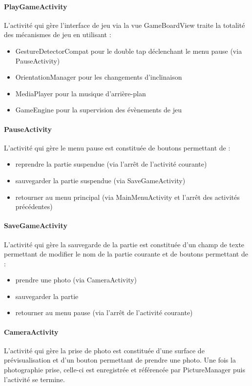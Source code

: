 \documentclass{article}
\begin{document}
\paragraph{PlayGameActivity}
L’activité qui gère l’interface de jeu via la vue GameBoardView traite la totalité des mécanismes de jeu en utilisant :
\begin{itemize}
\item GestureDetectorCompat pour le double tap déclenchant le menu pause (via PauseActivity)
\item OrientationManager pour les changements d’inclinaison
\item MediaPlayer pour la musique d’arrière-plan
\item GameEngine pour la supervision des évènements de jeu
\end{itemize}

\paragraph{PauseActivity}
L’activité qui gère le menu pause est constituée de boutons permettant de :
\begin{itemize}
\item reprendre la partie suspendue (via l’arrêt de l’activité courante)
\item sauvegarder la partie suspendue (via SaveGameActivity)
\item retourner au menu principal (via MainMenuActivity et l’arrêt des activités précédentes)
\end{itemize}

\paragraph{SaveGameActivity}
L’activité qui gère la sauvegarde de la partie est constituée d’un champ de texte permettant de modifier le nom de la partie courante et de boutons permettant de :
\begin{itemize}
\item prendre une photo (via CameraActivity)
\item sauvegarder la partie
\item retourner au menu pause (via l’arrêt de l’activité courante)
\end{itemize}

\paragraph{CameraActivity}
L’activité qui gère la prise de photo est constituée d’une surface de prévisualisation et d’un bouton permettant de prendre une photo. Une fois la photographie prise, celle-ci est enregistrée et référencée par PictureManager puis l’activité se termine.
\end{document}

